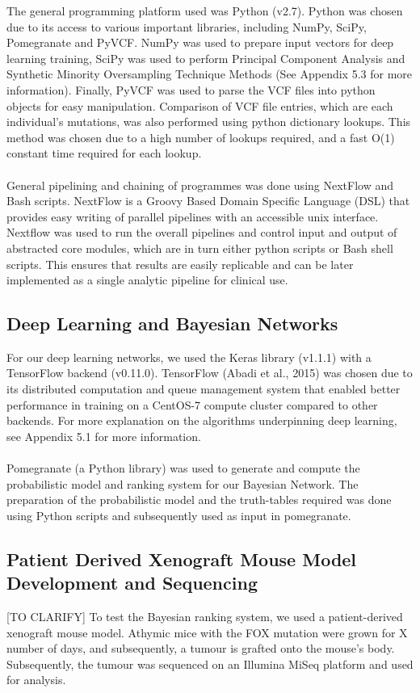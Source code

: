 \documentclass{article}
\begin{document}
The general programming platform used was Python (v2.7). Python was chosen due to its access to various important libraries, including NumPy, SciPy, Pomegranate and PyVCF. NumPy was used to prepare input vectors for deep learning training, SciPy was used to perform Principal Component Analysis and Synthetic Minority Oversampling Technique Methods (See Appendix 5.3 for more information). Finally, PyVCF was used to parse the VCF files into python objects for easy manipulation. Comparison of VCF file entries, which are each individual's mutations, was also performed using python dictionary lookups. This method was chosen due to a high number of lookups required, and a fast O(1) constant time required for each lookup.\\\\
General pipelining and chaining of programmes was done using NextFlow and Bash scripts. NextFlow is a Groovy Based Domain Specific Language (DSL) that provides easy writing of parallel pipelines with an accessible unix interface. Nextflow was used to run the overall pipelines and control input and output of abstracted core modules, which are in turn either python scripts or Bash shell scripts. This ensures that results are easily replicable and can be later implemented as a single analytic pipeline for clinical use.

\subsection{Deep Learning and Bayesian Networks}
For our deep learning networks, we used the Keras library (v1.1.1) with a TensorFlow backend (v0.11.0). TensorFlow (Abadi et al., 2015) was chosen due to its distributed computation and queue management system that enabled better performance in training on a CentOS-7 compute cluster compared to other backends. For more explanation on the algorithms underpinning deep learning, see Appendix 5.1 for more information.\\\\
Pomegranate (a Python library) was used to generate and compute the probabilistic model and ranking system for our Bayesian Network. The preparation of the probabilistic model and the truth-tables required was done using Python scripts and subsequently used as input in pomegranate.

\subsection{Patient Derived Xenograft Mouse Model Development and Sequencing}
[TO CLARIFY] To test the Bayesian ranking system, we used a patient-derived xenograft mouse model. Athymic mice with the FOX mutation were grown for X number of days, and subsequently, a tumour is grafted onto the mouse's body. Subsequently, the tumour was sequenced on an Illumina MiSeq platform and used for analysis. 
\end{document}
